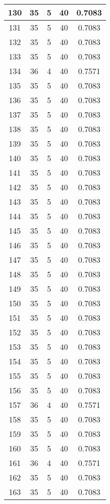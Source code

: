 \documentclass[letterpaper, 12pt]{article}
\begin{document}
\begin{longtable}{|c|c|c|c|c|}
\hline
130 & 35 & 5 & 40 & 0.7083 \\
\hline
131 & 35 & 5 & 40 & 0.7083 \\
\hline
132 & 35 & 5 & 40 & 0.7083 \\
\hline
133 & 35 & 5 & 40 & 0.7083 \\
\hline
134 & 36 & 4 & 40 & 0.7571 \\
\hline
135 & 35 & 5 & 40 & 0.7083 \\
\hline
136 & 35 & 5 & 40 & 0.7083 \\
\hline
137 & 35 & 5 & 40 & 0.7083 \\
\hline
138 & 35 & 5 & 40 & 0.7083 \\
\hline
139 & 35 & 5 & 40 & 0.7083 \\
\hline
140 & 35 & 5 & 40 & 0.7083 \\
\hline
141 & 35 & 5 & 40 & 0.7083 \\
\hline
142 & 35 & 5 & 40 & 0.7083 \\
\hline
143 & 35 & 5 & 40 & 0.7083 \\
\hline
144 & 35 & 5 & 40 & 0.7083 \\
\hline
145 & 35 & 5 & 40 & 0.7083 \\
\hline
146 & 35 & 5 & 40 & 0.7083 \\
\hline
147 & 35 & 5 & 40 & 0.7083 \\
\hline
148 & 35 & 5 & 40 & 0.7083 \\
\hline
149 & 35 & 5 & 40 & 0.7083 \\
\hline
150 & 35 & 5 & 40 & 0.7083 \\
\hline
151 & 35 & 5 & 40 & 0.7083 \\
\hline
152 & 35 & 5 & 40 & 0.7083 \\
\hline
153 & 35 & 5 & 40 & 0.7083 \\
\hline
154 & 35 & 5 & 40 & 0.7083 \\
\hline
155 & 35 & 5 & 40 & 0.7083 \\
\hline
156 & 35 & 5 & 40 & 0.7083 \\
\hline
157 & 36 & 4 & 40 & 0.7571 \\
\hline
158 & 35 & 5 & 40 & 0.7083 \\
\hline
159 & 35 & 5 & 40 & 0.7083 \\
\hline
160 & 35 & 5 & 40 & 0.7083 \\
\hline
161 & 36 & 4 & 40 & 0.7571 \\
\hline
162 & 35 & 5 & 40 & 0.7083 \\
\hline
163 & 35 & 5 & 40 & 0.7083 \\

\end{longtable}
\end{document}
